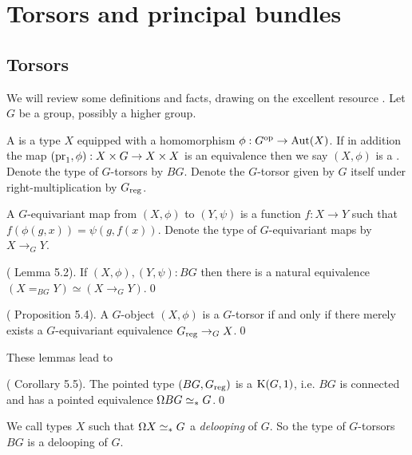 \section{Torsors and principal bundles}
\label{sec:torsors}

\subsection{Torsors}
\label{subsec:torsors}
We will review some definitions and facts, drawing on the excellent resource \cite{buchholtz2023central}. Let \( G \) be a group, possibly a higher group.
\begin{mydef}
A  is a type \( X \) equipped with a homomorphism \( \phi:G^{\mathrm{op}}\to\operatorname{Aut}(X) \). If in addition the map \( (\mathrm{pr}_1,\phi):X\times G\to X\times X \) is an equivalence then we say \( (X,\phi) \) is a . Denote the type of \( G \)-torsors by \( BG \). Denote the \( G \)-torsor given by \( G \) itself under right-multiplication by \( {G}_\mathrm{reg} \).
\end{mydef}

A \( G \)-equivariant map from \( (X,\phi) \) to \( (Y,\psi) \) is a function \( f:X\to Y \) such that \( f(\phi(g,x))=\psi(g,f(x)) \). Denote the type of \( G \)-equivariant maps by \( X\to_G Y \).

\begin{mylemma}
(\cite{buchholtz2023central} Lemma 5.2). If \( (X,\phi),(Y,\psi):BG \) then there is a natural equivalence \( (X=_{BG}Y) \simeq (X\to_G Y) \).\qed
\end{mylemma}

\begin{mylemma}
(\cite{buchholtz2023central} Proposition 5.4). A \( G \)-object \( (X,\phi) \) is a \( G \)-torsor if and only if there merely exists a \( G \)-equivariant equivalence \( {G}_\mathrm{reg}\to_G X \).\qed
\end{mylemma}

These lemmas lead to

\begin{mycor}
(\cite{buchholtz2023central} Corollary 5.5). The pointed type \( (BG,{G}_\mathrm{reg}) \) is a \( \mathrm{K}(G,1) \), i.e. \( BG \) is connected and has a pointed equivalence \( \Omega BG\simeq_* G \).\qed
\end{mycor}

We call types \( X \) such that \( \Omega X\simeq_* G \) a \emph{delooping} of \( G \). So the type of \( G \)-torsors \( BG \) is a delooping of \( G \).

